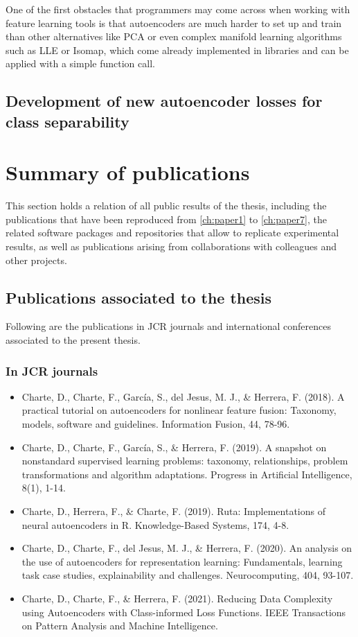 One of the first obstacles that programmers may come across when working with feature learning tools is that autoencoders are much harder to set up and train than other alternatives like PCA or even complex manifold learning algorithms such as LLE or Isomap, which come already implemented in libraries and can be applied with a simple function call.


\subsection{Development of new autoencoder losses for class separability}

\section{Summary of publications}

This section holds a relation of all public results of the thesis, including the publications that have been reproduced from \autoref{ch:paper1} to \autoref{ch:paper7}, the related software packages and repositories that allow to replicate experimental results, as well as publications arising from collaborations with colleagues and other projects.

\subsection{Publications associated to the thesis}

Following are the publications in JCR journals and international conferences associated to the present thesis.

\subsubsection{In JCR journals}

\begin{itemize}
    \item Charte, D., Charte, F., García, S., del Jesus, M. J., \& Herrera, F. (2018). A practical tutorial on autoencoders for nonlinear feature fusion: Taxonomy, models, software and guidelines. Information Fusion, 44, 78-96.
    \item Charte, D., Charte, F., García, S., \& Herrera, F. (2019). A snapshot on nonstandard supervised learning problems: taxonomy, relationships, problem transformations and algorithm adaptations. Progress in Artificial Intelligence, 8(1), 1-14.
    \item Charte, D., Herrera, F., \& Charte, F. (2019). Ruta: Implementations of neural autoencoders in R. Knowledge-Based Systems, 174, 4-8.
    \item Charte, D., Charte, F., del Jesus, M. J., \& Herrera, F. (2020). An analysis on the use of autoencoders for representation learning: Fundamentals, learning task case studies, explainability and challenges. Neurocomputing, 404, 93-107.
    \item Charte, D., Charte, F., \& Herrera, F. (2021). Reducing Data Complexity using Autoencoders with Class-informed Loss Functions. IEEE Transactions on Pattern Analysis and Machine Intelligence.
\end{itemize}


